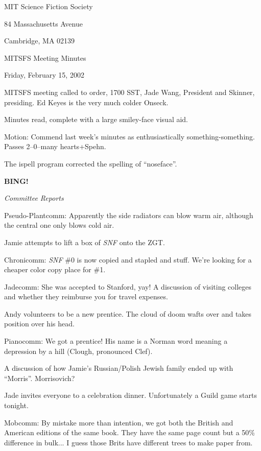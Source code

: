 \documentclass[12pt]{article}
\newcommand{\bing}{{\bf BING!} }
\newcommand{\goto}[1]{\bing \vskip 12pt \centerline{{\em{#1}}}}
\begin{document}
\begin{center}

MIT Science Fiction Society 

84 Massachusetts Avenue

Cambridge, MA 02139

\vspace{12pt}

MITSFS Meeting Minutes 

Friday, February 15, 2002

\end{center}
 
\vspace{18pt}

\setlength{\parskip}{6pt}

\noindent
MITSFS meeting called to order, 1700 SST, Jade Wang, President and
Skinner, presiding.  Ed Keyes is the very much colder Onseck.

Minutes read, complete with a large smiley-face visual aid.

Motion: Commend last week's minutes as enthusiastically something-something.
Passes 2--0--many hearts+Spehn.

The ispell program corrected the spelling of ``noseface''.

\goto{Committee Reports}

Pseudo-Plantcomm: Apparently the side radiators can blow warm air,
although the central one only blows cold air.

Jamie attempts to lift a box of {\em SNF} onto the ZGT.

Chronicomm: {\em SNF} \#0 is now copied and stapled and stuff.  We're
looking for a cheaper color copy place for \#1.

Jadecomm: She was accepted to Stanford, yay!  A discussion of visiting
colleges and whether they reimburse you for travel expenses.

Andy volunteers to be a new prentice.  The cloud of doom wafts over
and takes position over his head.

Pianocomm: We got a prentice!  His name is a Norman word meaning a
depression by a hill (Clough, pronounced Clef).

A discussion of how Jamie's Russian/Polish Jewish family ended up
with ``Morris''.  Morrisovich?

Jade invites everyone to a celebration dinner.  Unfortunately a
Guild game starts tonight.

Mobcomm: By mistake more than intention, we got both the British and
American editions of the same book.  They have the same page count but
a 50\% difference in bulk... I guess those Brits have different trees to
make paper from.
\end{document}
